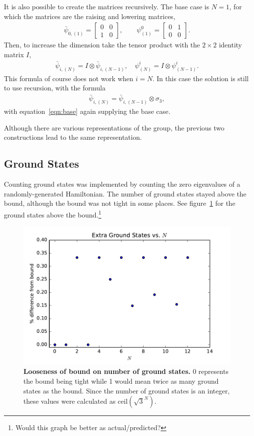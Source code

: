 \documentclass[12pt]{article} %
\begin{document}
It is also possible to create the matrices recursively. The base case is $N=1$, for which the matrices are the raising and lowering matrices,
\begin{align}
\bar\psi_{0,(1)} = \begin{bmatrix} 0&0\\1&0 \end{bmatrix}, \qquad
    \psi^0_{(1)} = \begin{bmatrix} 0&1\\0&0 \end{bmatrix}. \label{eqn:base}
\end{align}
Then, to increase the dimension take the tensor product with the $2\times 2$ identity matrix $I$,
\begin{align}
\bar\psi_{i,(N)} = I\otimes\bar\psi_{i,(N-1)},\quad \psi^i_{(N)} = I\otimes 
	\psi^i_{(N-1)}.
\end{align}
This formula of course does not work when $i=N$. In this case the solution is still to use recursion, with the formula
\begin{align}
\bar\psi_{i,(N)} = \bar\psi_{i,(N-1)}\otimes\sigma_3,
\end{align}
with equation~\ref{eqn:base} again supplying the base case.

Although there are various representations of the group, the previous two constructions lead to the same representation. 

\subsection{Ground States} \emph{}

Counting ground states was implemented by counting the zero eigenvalues of a randomly-generated Hamiltonian. The number of ground states stayed above the bound, although the bound was not tight in some places. See figure~\ref{fig:gserr} for the ground states above the bound.\footnote{Would this graph be better as actual/predicted?}

\begin{figure}
	\centering
	\includegraphics[width=.5\textwidth]{gserr}
	\caption{\textbf{Looseness of bound on number of ground states.} 0 represents the bound being tight while 1 would mean twice as many ground states as the bound. Since the number of ground states is an integer, these values were calculated as $\text{ceil}(\sqrt{3}^N)$.}
	\label{fig:gserr}
\end{figure}
\end{document}

